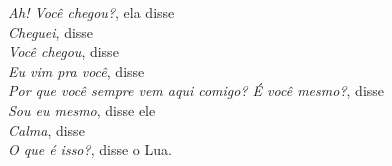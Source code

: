 \bigskip

\begin{linenumbers}
\noindent \textit{Ah! Você chegou?}, ela disse\\
\textit{Cheguei}, disse\\
\textit{Você chegou}, disse\\
\textit{Eu vim pra você}, disse\\
\textit{Por que você sempre vem aqui comigo? É você mesmo?}, disse\\
\textit{Sou eu mesmo}, disse ele\\
\textit{Calma}, disse\\
\textit{O que é isso?}, disse o Lua.
\end{linenumbers}

\bigskip

